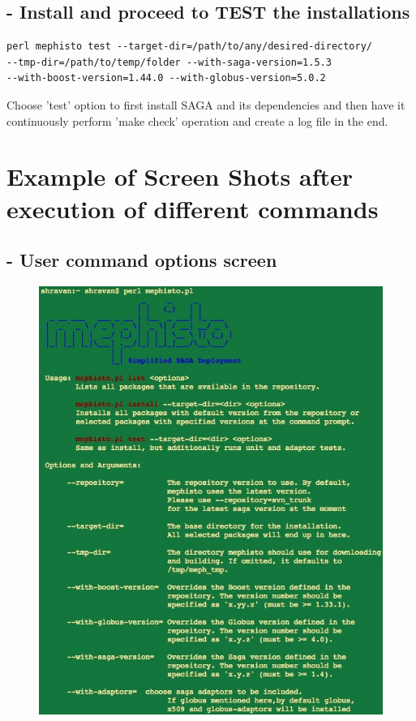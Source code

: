 \documentclass[a4paper,10pt]{article}
\begin{document}
\subsection*{- Install and proceed to TEST the installations}
\begin{verbatim}
perl mephisto test --target-dir=/path/to/any/desired-directory/ 
--tmp-dir=/path/to/temp/folder --with-saga-version=1.5.3 
--with-boost-version=1.44.0 --with-globus-version=5.0.2
\end{verbatim}
Choose 'test' option to first install SAGA and its dependencies and then have it
continuously perform 'make check' operation and create a log file in the end.
\section*{Example of Screen Shots after execution of different commands}
\subsection*{- User command options screen}
\begin{figure}[H]
\begin{center}
\includegraphics[scale=0.60]{userscreen1.jpg}
\end{center}
\end{figure}
\end{document}

